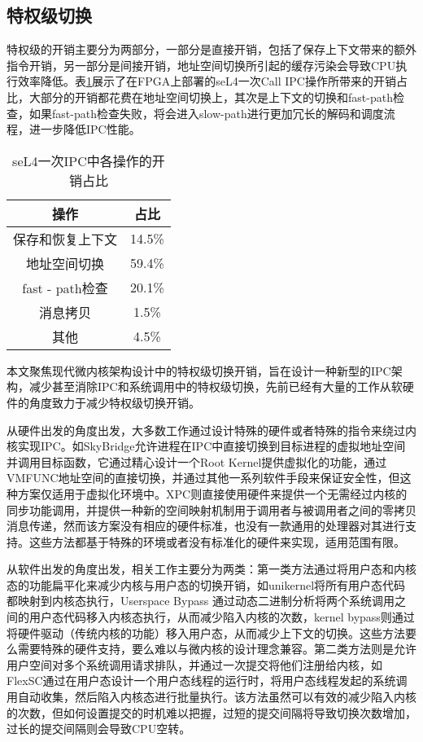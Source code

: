 \subsection{特权级切换}
特权级的开销主要分为两部分，一部分是直接开销，包括了保存上下文带来的额外指令开销，另一部分是间接开销，地址空间切换所引起的缓存污染会导致CPU执行效率降低。表\ref{tab:seL4_call_cost}展示了在FPGA上部署的seL4一次Call IPC操作所带来的开销占比，大部分的开销都花费在地址空间切换上，其次是上下文的切换和fast-path检查，如果fast-path检查失败，将会进入slow-path进行更加冗长的解码和调度流程，进一步降低IPC性能。
\begin{table}
    \centering
    \begin{tabular}{|c|c|}
        \hline 
        操作 & 占比 \\
        \hline
        保存和恢复上下文 & 14.5\% \\
        \hline
        地址空间切换 & 59.4\% \\
        \hline
        fast - path检查 & 20.1\% \\
        \hline
        消息拷贝 & 1.5\% \\
        \hline
        其他 & 4.5\% \\
        \hline
    \end{tabular}
    \caption{seL4一次IPC中各操作的开销占比}
    \label{tab:seL4_call_cost}
\end{table}
    

本文聚焦现代微内核架构设计中的特权级切换开销，旨在设计一种新型的IPC架构，减少甚至消除IPC和系统调用中的特权级切换，先前已经有大量的工作从软硬件的角度致力于减少特权级切换开销。

从硬件出发的角度出发，大多数工作通过设计特殊的硬件或者特殊的指令来绕过内核实现IPC。如SkyBridge\cite{mi2019skybridge}允许进程在IPC中直接切换到目标进程的虚拟地址空间并调用目标函数，它通过精心设计一个Root Kernel提供虚拟化的功能，通过VMFUNC地址空间的直接切换，并通过其他一系列软件手段来保证安全性，但这种方案仅适用于虚拟化环境中。XPC\cite{du2019xpc}则直接使用硬件来提供一个无需经过内核的同步功能调用，并提供一种新的空间映射机制用于调用者与被调用者之间的零拷贝消息传递，然而该方案没有相应的硬件标准，也没有一款通用的处理器对其进行支持。这些方法都基于特殊的环境或者没有标准化的硬件来实现，适用范围有限。

从软件出发的角度出发，相关工作主要分为两类：第一类方法通过将用户态和内核态的功能扁平化来减少内核与用户态的切换开销，如unikernel\cite{kuo2020linux, olivier2019binary, yu2017web}将所有用户态代码都映射到内核态执行，Userspace Bypass\cite{zhou2023userspace} 通过动态二进制分析将两个系统调用之间的用户态代码移入内核态执行，从而减少陷入内核的次数，kernel bypass\cite{jeong2014mtcp, yang2017spdk}则通过将硬件驱动（传统内核的功能）移入用户态，从而减少上下文的切换。这些方法要么需要特殊的硬件支持，要么难以与微内核的设计理念兼容。第二类方法则是允许用户空间对多个系统调用请求排队，并通过一次提交将他们注册给内核，如FlexSC\cite{soares2010flexsc}通过在用户态设计一个用户态线程的运行时，将用户态线程发起的系统调用自动收集，然后陷入内核态进行批量执行。该方法虽然可以有效的减少陷入内核的次数，但如何设置提交的时机难以把握，过短的提交间隔将导致切换次数增加，过长的提交间隔则会导致CPU空转。

